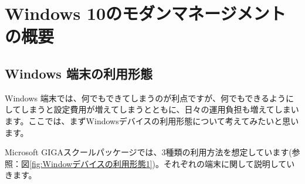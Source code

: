 \chapter{Windows 10のモダンマネージメントの概要}
\label{chap:モダンマネージメント}

\section{Windows 端末の利用形態}

Windows 端末では、何でもできてしまうのが利点ですが、何でもできるようにしてしまうと設定費用が増えてしまうとともに、日々の運用負担も増えてしまいます。ここでは、まずWindowsデバイスの利用形態について考えてみたいと思います。

Microsoft GIGAスクールパッケージでは、3種類の利用方法を想定しています(参照：図\ref{fig:Windowデバイスの利用形態1})。それぞれの端末に関して説明していきます。

